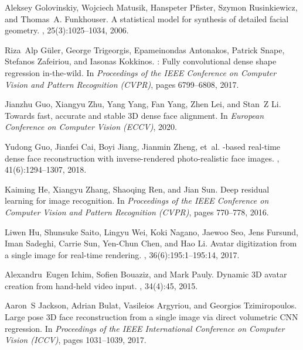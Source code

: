 \documentclass[final]{cvpr}
\begin{document}
{\begin{thebibliography}{10}
Aleksey Golovinskiy, Wojciech Matusik, Hanspeter Pfister, Szymon Rusinkiewicz,
  and Thomas~A. Funkhouser.
\newblock A statistical model for synthesis of detailed facial geometry.
, 25(3):1025--1034, 2006.

Riza~Alp G{\"u}ler, George Trigeorgis, Epameinondas Antonakos, Patrick Snape,
  Stefanos Zafeiriou, and Iasonas Kokkinos.
: Fully convolutional dense shape regression in-the-wild.
\newblock In {\em Proceedings of the IEEE Conference on Computer Vision and
  Pattern Recognition (CVPR)}, pages 6799--6808, 2017.

Jianzhu Guo, Xiangyu Zhu, Yang Yang, Fan Yang, Zhen Lei, and Stan~Z Li.
\newblock Towards fast, accurate and stable {3D} dense face alignment.
\newblock In {\em European Conference on Computer Vision (ECCV)}, 2020.

Yudong Guo, Jianfei Cai, Boyi Jiang, Jianmin Zheng, et~al.
-based real-time dense face reconstruction with inverse-rendered
  photo-realistic face images.
, 41(6):1294--1307, 2018.

Kaiming He, Xiangyu Zhang, Shaoqing Ren, and Jian Sun.
\newblock Deep residual learning for image recognition.
\newblock In {\em Proceedings of the IEEE Conference on Computer Vision and
  Pattern Recognition (CVPR)}, pages 770--778, 2016.

Liwen Hu, Shunsuke Saito, Lingyu Wei, Koki Nagano, Jaewoo Seo, Jens Fursund,
  Iman Sadeghi, Carrie Sun, Yen-Chun Chen, and Hao Li.
\newblock Avatar digitization from a single image for real-time rendering.
, 36(6):195:1--195:14, 2017.

Alexandru~Eugen Ichim, Sofien Bouaziz, and Mark Pauly.
\newblock Dynamic {3D} avatar creation from hand-held video input.
, 34(4):45, 2015.

Aaron~S Jackson, Adrian Bulat, Vasileios Argyriou, and Georgios Tzimiropoulos.
\newblock Large pose {3D} face reconstruction from a single image via direct
  volumetric {CNN} regression.
\newblock In {\em Proceedings of the IEEE International Conference on Computer
  Vision (ICCV)}, pages 1031--1039, 2017.


\end{thebibliography}}
\end{document}
